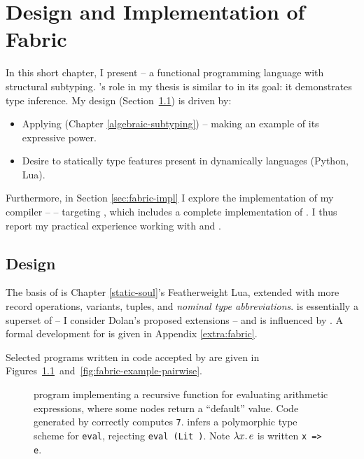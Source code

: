 \chapter{Design and Implementation of Fabric}
\label{fabric}

In this short chapter, I present \textbf{\fabric{}} -- a functional programming language with structural subtyping. 
\fabric{}'s role in my thesis is similar to \mlsub{} \cite{dolan-thesis} in its goal: it demonstrates type inference. My design (Section~\ref{sec:fabric-design}) is driven by: \begin{itemize}
    \item Applying \inference{} (Chapter \ref{algebraic-subtyping}) -- making \fabric{} an example of its expressive power.
    \item Desire to statically type features present in dynamically languages (Python, Lua).
\end{itemize}
Furthermore, in Section \ref{sec:fabric-impl} I explore the implementation of my \fabric{} compiler -- \compiler{} -- targeting \wasm{}, which includes a complete implementation of \inference{}. I thus report my practical experience working with \wasm{} and \inference{}.

\section{Design}
\label{sec:fabric-design}

The basis of \fabric{} is Chapter \ref{static-soul}'s Featherweight Lua, extended with more record operations, variants, tuples, and \emph{nominal type abbreviations}. \fabric{} is essentially a superset of \mlsub{} \cite{mlsub} -- I consider Dolan's proposed extensions \cite[Chapter~9]{dolan-thesis} -- and is influenced by \mlstruct{} \cite{mlstruct}. 
A formal development for \fabric{} is given in Appendix \ref{extra:fabric}.


Selected \fabric{} programs written in code accepted by \compiler{} are given in Figures~\ref{fig:fabric-example-eval}~and~\ref{fig:fabric-example-pairwise}.


\begin{figure}[p]
    \centering
    
    \caption{\fabric{} program implementing a recursive function for evaluating arithmetic expressions, where some nodes return a \enquote{default} value. Code generated by \compiler{} correctly computes \texttt{7}. \inference{} infers a polymorphic type scheme for \texttt{eval}, \eg{} rejecting \texttt{eval (Lit {})}. Note $\lambda {x} \ldotp e$ is written \texttt{x => e}.}
    \label{fig:fabric-example-eval}
\end{figure}

